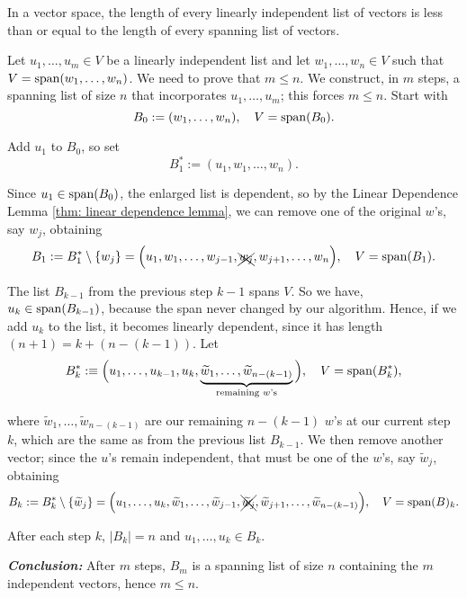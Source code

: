 \setcounter{thm}{21}
\begin{thm}  
  \label{thm: length of linearly dependent list less or equal to length of spanning list}
  In a \fd vector space, the length of every linearly independent list of vectors is less than or equal to the length of every spanning list of vectors.
\end{thm}
\begin{prf}
  Let $u_1, \ldots, u_m \in V$ be a linearly independent list and let $w_1, \ldots, w_n \in V$ such that $V=\operatorname{span} (w_1, \ldots, w_n)$. We need to prove that $m \leq n$.
  We construct, in $m$ steps, a spanning list of size $n$ that incorporates $u_1,\dots,u_m$; this forces $m\le n$.  Start with
  \[
      B_0 :=  (w_1, \dots, w_n),
      \quad V = \operatorname{span} (B_0).
  \]

   Add $u_1$ to $B_0$, so set
  \begin{equation}
    B_1^* := (u_1, w_1, \ldots, w_n).
  \end{equation}

  Since $u_1 \in \operatorname{span} (B_0)$, the enlarged list is dependent, so by the Linear Dependence Lemma \ref{thm: linear dependence lemma}, we can remove one of the original $w$'s, say $w_j$, obtaining
  \begin{equation*}
    B_1 := B_1^* \setminus \{w_j\} = \Big(u_1, w_1, \ldots, w_{j-1}, \xcancel{w_j}, w_{j+1}, \ldots, w_n\Big), \quad V=\operatorname{span} (B_1).
  \end{equation*}

   The list $B_{k-1}$ from the previous step $k-1$ spans $V$. So we have, $u_{k} \in \operatorname{span} (B_{k-1})$, because the span never changed by our algorithm. Hence, if we add $u_k$ to the list, it becomes linearly dependent, since it has length $(n+1) = k + (n-(k-1))$. Let
  \begin{equation*}
    B_k^* :\equiv \Big(u_1, \ldots, u_{k-1}, u_k, \underbrace{\widetilde w_{1}, \ldots, \widetilde w_{n-(k-1)} }_{\text{remaining $w$'s}} \Big), \quad V=\operatorname{span} (B_k^*),
  \end{equation*}

  where $\widetilde w_{1}, \ldots, \widetilde w_{n-(k-1)}$ are our remaining $n-(k-1)$ $w$'s at our current step $k$, which are the same as from the previous list $B_{k-1}$. We then remove another vector; since the $u$'s remain independent, that must be one of the $w$'s, say $\widetilde w_j$, obtaining
  \begin{equation*}
    B_k := B_k^* \setminus \{\widetilde w_j \} = \Big(u_1, \ldots, u_{k},  \widetilde w_1, \ldots, \widetilde w_{j-1}, \xcancel{\widetilde w_j}, \widetilde w_{j+1}, \ldots, \widetilde w_{n-(k-1)}\Big), \quad V=\operatorname{span} (B)_k.
  \end{equation*}

  After each step $k$, $\lvert B_k\rvert = n$ and $u_1,\dots,u_k\in B_k$.

  \emph{\bfseries Conclusion:} After $m$ steps, $B_m$ is a spanning list of size $n$ containing the $m$ independent vectors, hence $m \leq n$.
\end{prf}

